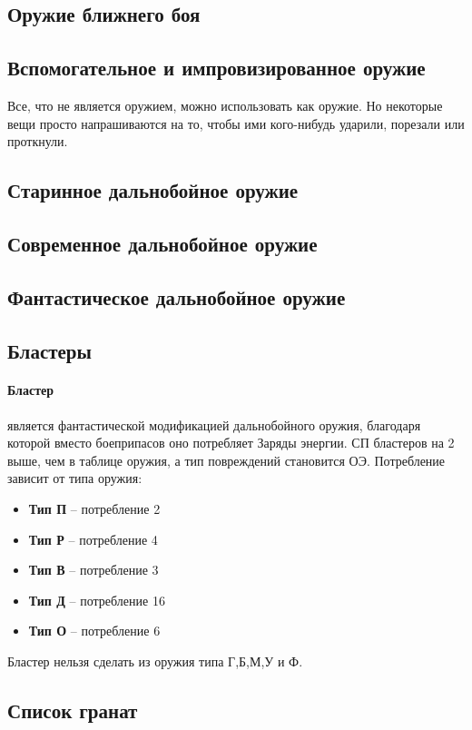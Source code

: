 \subsection{Оружие ближнего боя}

\subsection{Вспомогательное и импровизированное оружие}
Все, что не является оружием, можно использовать как оружие. Но некоторые вещи просто напрашиваются на то, чтобы ими кого-нибудь ударили, порезали или проткнули.

\subsection{Старинное дальнобойное оружие}

\subsection{Современное дальнобойное оружие}

\subsection{Фантастическое дальнобойное оружие}

\subsection{Бластеры}
\paragraph{Бластер} является фантастической модификацией дальнобойного оружия, благодаря которой вместо боеприпасов оно потребляет Заряды энергии. СП бластеров на 2 выше, чем в таблице оружия, а тип повреждений становится ОЭ. Потребление зависит от типа оружия:
\begin{itemize}
\item \textbf{Тип П} -- потребление 2
\item \textbf{Тип Р} -- потребление 4
\item \textbf{Тип В} -- потребление 3
\item \textbf{Тип Д} -- потребление 16
\item \textbf{Тип О} -- потребление 6
\end{itemize}
Бластер нельзя сделать из оружия типа Г,Б,М,У и Ф.

\printindex[weapons]


\subsection{Список гранат}

